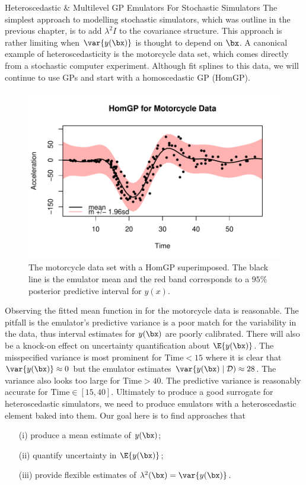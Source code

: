 \begin{chapter}{Heteroscedastic \& Multilevel GP Emulators For Stochastic Simulators\label{Ch:Hetsml}}
The simplest approach to modelling stochastic simulators, which was outline in the previous chapter, is to add $\lambda^2 I$ to the covariance structure. This approach is rather limiting when $\var\{ y(\bx) \}$ is thought to depend on $\bx$. A canonical example of heteroscedasticity is the motorcycle data set, which comes directly from a stochastic computer experiment. Although \citet{Silverman1985} fit splines to this data, we will continue to use GPs and start with a homoscedastic GP (HomGP).
\begin{figure}[ht]
	\includegraphics{fig-het-sml/mcycle-homgp.pdf}
	\caption{The motorcycle data set with a HomGP superimposed. The black line is the emulator mean and the red band corresponds to a $95\%$ posterior predictive interval for $y(x)$.}
	\label{Fig:mcycle-hom}
\end{figure}
Observing the fitted mean function in  for the motorcycle data is reasonable. The pitfall is the emulator's predictive variance is a poor match for the variability in the data, thus interval estimates for $y(\bx)$ are poorly calibrated. There will also be a knock-on effect on uncertainty quantification about $\E \{ y(\bx) \}$. The misspecified variance is most prominent for $\text{Time}<15$ where it is clear that $\var \{y(\bx) \} \approx 0$ but the emulator estimates $\var\{ y(\bx) \mid \mathcal{D}) \approx 28$. The variance also looks too large for $\text{Time}>40$. The predictive variance is reasonably accurate for $\text{Time} \in [15, 40]$. Ultimately to produce a good surrogate for heteroscedastic simulators, we need to produce emulators with a heteroscedastic element baked into them. Our goal here is to find approaches that
\begin{itemize}
	\item[(i)] produce a mean estimate of $y(\bx)$;
	\item[(ii)] quantify uncertainty in $\E \{ y(\bx) \} $;
	\item[(iii)] provide flexible estimates of $\lambda^2(\bx) = \var\{ y(\bx) \}$.
\end{itemize}


\end{chapter}
